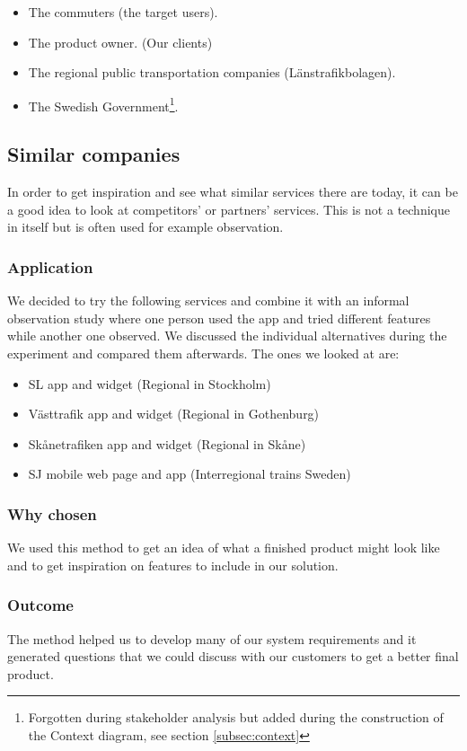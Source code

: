 \documentclass[a4paper]{article}
\begin{document}
		\begin{itemize}
			\item The commuters (the target users).
			\item The product owner. (Our clients)
			\item The regional public transportation companies (Länstrafikbolagen). 
			\item The Swedish Government\footnote{Forgotten during stakeholder analysis but added during the construction of the Context diagram, see section \ref{subsec:context}}.
		\end{itemize}
		
		\subsection{Similar companies}
			In order to get inspiration and see what similar services there are today, it can be a good idea to look at competitors' or partners' services. This is not a technique in itself but is often used for example observation.
	
		\subsubsection{Application}
			We decided to try the following services and combine it with an informal observation study where one person used the app and tried different features while another one observed. We discussed the individual alternatives during the experiment and compared them afterwards. The ones we looked at are:
			\begin{itemize}
				\item SL app and widget (Regional in Stockholm)
				\item Västtrafik app and widget (Regional in Gothenburg)
				\item Skånetrafiken app and widget (Regional in Skåne)
				\item SJ mobile web page and app (Interregional trains Sweden)
			\end{itemize}
	
		\subsubsection{Why chosen}
		We used this method to get an idea of what a finished product might look like and to get inspiration on features to include in our solution.
		\subsubsection{Outcome}
		The method helped us to develop many of our system requirements and it generated questions that we could discuss with our customers to get a better final product.
\end{document}
